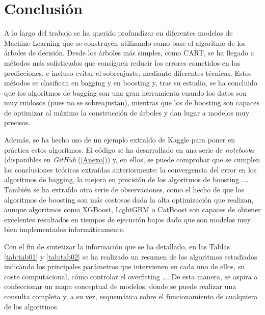 \documentclass[12pt,twoside]{article}
\begin{document}
\newpage
\section{Conclusión}
A lo largo del trabajo se ha querido profundizar en diferentes modelos de Machine Learning que se construyen utilizando como base el algoritmo de los árboles de decisión. Desde los árboles más simples, como CART, se ha llegado a métodos más sofisticados que consiguen reducir los errores cometidos en las predicciones, e incluso evitar el sobreajuste, mediante diferentes técnicas. Estos métodos se clasifican en bagging y en boosting y, tras su estudio, se ha concluido que los algoritmos de bagging son una gran herramienta cuando los datos son muy ruidosos (pues no se sobreajustan), mientras que los de boosting son capaces de optimizar al máximo la construcción de árboles y dan lugar a modelos muy precisos.

Además, se ha hecho uso de un ejemplo extraído de Kaggle para poner en práctica estos algoritmos. El código se ha desarrollado en una serie de \textit{notebooks} (disponibles en \textit{GitHub} (\ref{Anexo})) y, en ellos, se puede comprobar que se cumplen las conclusiones teóricas extraídas anteriormente: la convergencia del error en los algoritmos de bagging, la mejora en precisión de los algoritmos de boosting \dots. También se ha extraído otra serie de observaciones, como el hecho de que los algoritmos de boosting son más costosos dada la alta optimización que realizan, aunque algoritmos como XGBoost, LightGBM o CatBoost son capaces de obtener excelentes resultados en tiempos de ejecución bajos dado que son modelos muy bien implementados informáticamente. 

Con el fin de sintetizar la información que se ha detallado, en las Tablas \ref{tab:tab01} y \ref{tab:tab02} se ha realizado un resumen de los algoritmos estudiados indicando los principales parámetros que intervienen en cada uno de ellos, su coste computacional, cómo controlar el overfitting \dots. De esta manera, se aspira a confeccionar un mapa conceptual de modelos, donde se puede realizar una consulta completa y, a su vez, esquemática sobre el funcionamiento de cualquiera de los algoritmos.
\end{document}
